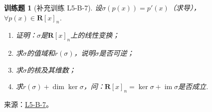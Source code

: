 \documentclass[12pt,fontset=fandol]{ctexart}
\newtheorem{exercise}{训练题}[section]
\begin{document}
\begin{exercise}[补充训练 L5-B-7]\label{prob:L5-B-7}
设$\sigma(p(x))=p'(x)$（求导），$\forall p(x) \in \mathbf{R}[x]_n$.
        \begin{enumerate}
            \item 证明：$\sigma$是$\mathbf{R}[x]_n$上的线性变换；

            \item 求$\sigma$的值域和$r(\sigma)$，说明$\sigma$是否可逆；

            \item 求$\sigma$的核及其维数；

            \item 求$r(\sigma)+\dim\ker\sigma$，问：$\mathbf{R}[x]_n=\ker\sigma+\operatorname{im} \sigma$是否成立.
        \end{enumerate}
\end{exercise}
\noindent 来源：\href{https://github.com/yhwu-is/Linear-Algebra-Left-Undone/blob/new/%E8%AE%B2%E4%B9%89/%E4%B8%93%E9%A2%98/5%20%E7%BA%BF%E6%80%A7%E6%98%A0%E5%B0%84.tex}{L5-B-7}。
\end{document}
